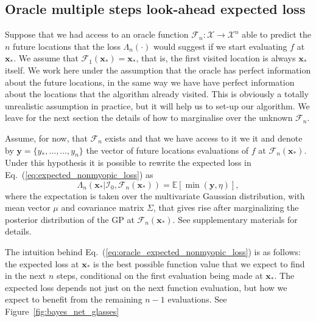 \documentclass[twoside]{article}
\newcommand{\I}{\mathcal{I}}
\newcommand{\E}{\mathbb{E}}
\newcommand{\bx}{\textbf{x}}
\newcommand{\by}{\textbf{y}}
\newcommand{\future}{\mathcal{F}}
\begin{document}
\subsection{Oracle multiple steps look-ahead expected loss}
Suppose that  we had access to an oracle function $\future_{n}: {\mathcal X}\rightarrow  {\mathcal X}^n$ able to predict the $n$ future  locations that the loss $\Lambda_n(\cdot)$ would suggest if we start evaluating $f$ at $\bx_*$. We assume that $\future_{1}(\bx_*)=\bx_*$, that is, the first visited location is always $\bx_*$ itself. We work here under the assumption that the oracle has perfect information about the future locations, in the same way we have have perfect information about the locations that the algorithm already visited. This is obviously a totally unrealistic assumption in practice, but it will help us to set-up our algorithm. We leave for the next section the details of how to marginalise over the unknown $\future_{n}$. 

Assume, for now, that $\future_{n}$ exists and that we have access to it we it and denote by $\by=\{y_*,\dots,\dots,y_n\}$ the vector of future locations evaluations of $f$ at $\future_n(\bx_*)$.  Under this hypothesis it is possible to rewrite the expected loss in Eq.~(\ref{eq:expected_nonmyopic_loss}) as
\begin{equation}\label{eq:oracle_expected_nonmyopic_loss}
\Lambda_n(\bx_*|\I_0, \future_{n}(\bx_*) ) = \E [\min (\by,\eta)], 
\end{equation}
where the expectation is taken over the multivariate Gaussian distribution, with mean vector $\mu$ and covariance matrix $\Sigma$, that gives rise after marginalizing the posterior distribution of the GP at $\future_{n}(\bx_*)$. See supplementary materials for details.

The intuition behind Eq.~(\ref{eq:oracle_expected_nonmyopic_loss}) is as follows: the expected loss at $\bx_*$ is the best possible function value that we expect to find in the next $n$ steps, conditional on the first evaluation being made at $\bx_*$. The expected loss depends not just on the next function evaluation, but how we expect to benefit from the remaining $n-1$ evaluations. See Figure~\ref{fig:bayes_net_glasses} 
\end{document}
